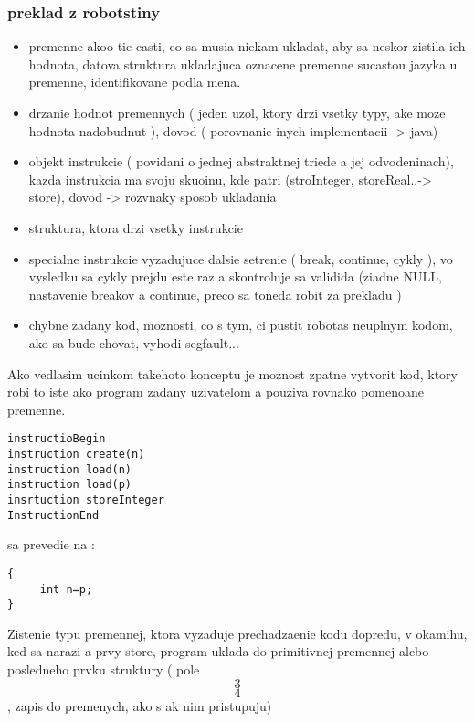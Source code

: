 \documentclass[a4paper,11pt,final]{report}
\begin{document}
\subsubsection{preklad z robotstiny}
\begin{itemize}
\item premenne akoo tie casti, co sa musia niekam ukladat, aby sa neskor zistila ich hodnota, datova struktura ukladajuca oznacene premenne
sucastou jazyka u premenne, identifikovane podla mena.  
\item drzanie hodnot premennych ( jeden uzol, ktory drzi vsetky typy, ake moze hodnota nadobudnut ), dovod ( porovnanie inych implementacii -> java)
\item objekt instrukcie ( povidani o jednej abstraktnej triede a jej odvodeninach), kazda instrukcia ma svoju skuoinu, kde patri (stroInteger, storeReal..-> store), dovod -> rozvnaky sposob ukladania
\item struktura, ktora drzi vsetky instrukcie
\item specialne instrukcie vyzadujuce dalsie setrenie ( break, continue, cykly ), vo vysledku sa cykly prejdu este raz a skontroluje sa validida (ziadne NULL, nastavenie breakov a continue, preco sa toneda robit za prekladu )
\item chybne zadany kod, moznosti, co s tym, ci pustit robotas  neuplnym kodom, ako sa bude chovat, vyhodi segfault...
\end{itemize}
Ako vedlasim ucinkom takehoto konceptu je moznost zpatne vytvorit kod, ktory robi to iste ako program zadany uzivatelom a pouziva rovnako pomenoane premenne.
\begin{verbatim}
instructioBegin	
instruction create(n)
instruction load(n)
instruction load(p)
insrtuction storeInteger
InstructionEnd
\end{verbatim}
sa prevedie na :
\begin{verbatim}
{
     int n=p;
}
\end{verbatim}
Zistenie typu premennej, ktora vyzaduje prechadzaenie kodu dopredu, v okamihu, ked sa narazi a prvy store, program uklada do primitivnej premennej alebo posledneho prvku  struktury ( pole \[3\]\[4\], zapis do premenych, ako s ak nim pristupuju)
\end{document}
